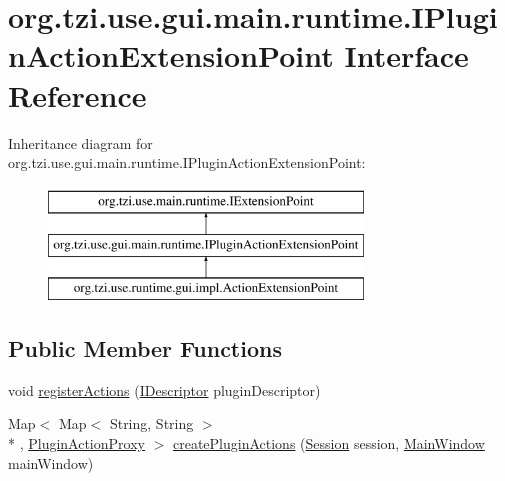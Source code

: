 \hypertarget{interfaceorg_1_1tzi_1_1use_1_1gui_1_1main_1_1runtime_1_1_i_plugin_action_extension_point}{\section{org.\-tzi.\-use.\-gui.\-main.\-runtime.\-I\-Plugin\-Action\-Extension\-Point Interface Reference}
\label{interfaceorg_1_1tzi_1_1use_1_1gui_1_1main_1_1runtime_1_1_i_plugin_action_extension_point}
}
Inheritance diagram for org.\-tzi.\-use.\-gui.\-main.\-runtime.\-I\-Plugin\-Action\-Extension\-Point\-:\begin{figure}[H]
\begin{center}
\leavevmode
\includegraphics[height=3.000000cm]{interfaceorg_1_1tzi_1_1use_1_1gui_1_1main_1_1runtime_1_1_i_plugin_action_extension_point}
\end{center}
\end{figure}
\subsection*{Public Member Functions}
\begin{DoxyCompactItemize}
\item 
void \hyperlink{interfaceorg_1_1tzi_1_1use_1_1gui_1_1main_1_1runtime_1_1_i_plugin_action_extension_point_a26970559831a907f16ed3d7a7e016937}{register\-Actions} (\hyperlink{interfaceorg_1_1tzi_1_1use_1_1main_1_1runtime_1_1_i_descriptor}{I\-Descriptor} plugin\-Descriptor)
\item 
Map$<$ Map$<$ String, String $>$\\*
, \hyperlink{classorg_1_1tzi_1_1use_1_1runtime_1_1gui_1_1impl_1_1_plugin_action_proxy}{Plugin\-Action\-Proxy} $>$ \hyperlink{interfaceorg_1_1tzi_1_1use_1_1gui_1_1main_1_1runtime_1_1_i_plugin_action_extension_point_a600d4845ff91fbf26d00f0ba0b18c105}{create\-Plugin\-Actions} (\hyperlink{classorg_1_1tzi_1_1use_1_1main_1_1_session}{Session} session, \hyperlink{classorg_1_1tzi_1_1use_1_1gui_1_1main_1_1_main_window}{Main\-Window} main\-Window)
\end{DoxyCompactItemize}


